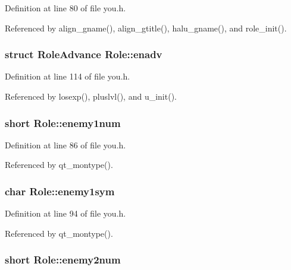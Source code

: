 Definition at line 80 of file you.\+h.



Referenced by align\+\_\+gname(), align\+\_\+gtitle(), halu\+\_\+gname(), and role\+\_\+init().

\hypertarget{structRole_a2d3cca1a7a810a18e8ed147b51be5e2f}{
\subsubsection[{enadv}]{\setlength{\rightskip}{0pt plus 5cm}struct {\bf Role\+Advance} Role\+::enadv}}\label{structRole_a2d3cca1a7a810a18e8ed147b51be5e2f}


Definition at line 114 of file you.\+h.



Referenced by losexp(), pluslvl(), and u\+\_\+init().

\hypertarget{structRole_afd83037707f346bb77d598d7127d91c7}{
\subsubsection[{enemy1num}]{\setlength{\rightskip}{0pt plus 5cm}short Role\+::enemy1num}}\label{structRole_afd83037707f346bb77d598d7127d91c7}


Definition at line 86 of file you.\+h.



Referenced by qt\+\_\+montype().

\hypertarget{structRole_af9435006074321c68acd62a0984e6aa3}{
\subsubsection[{enemy1sym}]{\setlength{\rightskip}{0pt plus 5cm}char Role\+::enemy1sym}}\label{structRole_af9435006074321c68acd62a0984e6aa3}


Definition at line 94 of file you.\+h.



Referenced by qt\+\_\+montype().

\hypertarget{structRole_aaf0a9b355748df254a91e298e7fc1d08}{
\subsubsection[{enemy2num}]{\setlength{\rightskip}{0pt plus 5cm}short Role\+::enemy2num}}\label{structRole_aaf0a9b355748df254a91e298e7fc1d08}


